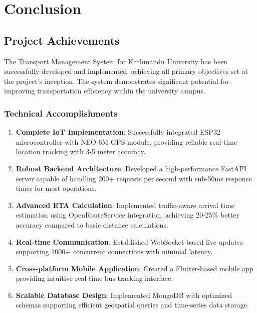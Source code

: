 \documentclass[12pt,a4paper]{article}
\begin{document}
\section{Conclusion}

\subsection{Project Achievements}

The Transport Management System for Kathmandu University has been successfully developed and implemented, achieving all primary objectives set at the project's inception. The system demonstrates significant potential for improving transportation efficiency within the university campus.

\subsubsection{Technical Accomplishments}

\begin{enumerate}
    \item \textbf{Complete IoT Implementation}: Successfully integrated ESP32 microcontroller with NEO-6M GPS module, providing reliable real-time location tracking with 3-5 meter accuracy.

    \item \textbf{Robust Backend Architecture}: Developed a high-performance FastAPI server capable of handling 200+ requests per second with sub-50ms response times for most operations.

    \item \textbf{Advanced ETA Calculation}: Implemented traffic-aware arrival time estimation using OpenRouteService integration, achieving 20-25\% better accuracy compared to basic distance calculations.

    \item \textbf{Real-time Communication}: Established WebSocket-based live updates supporting 1000+ concurrent connections with minimal latency.

    \item \textbf{Cross-platform Mobile Application}: Created a Flutter-based mobile app providing intuitive real-time bus tracking interface.

    \item \textbf{Scalable Database Design}: Implemented MongoDB with optimized schemas supporting efficient geospatial queries and time-series data storage.
\end{enumerate}
\end{document}
